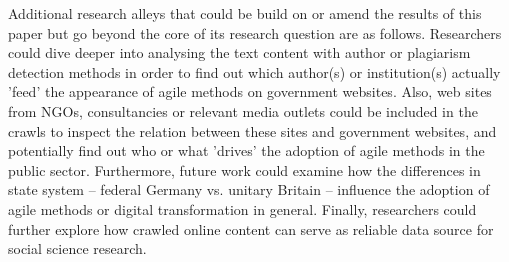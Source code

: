 Additional research alleys that could be build on or amend the results of this paper but go beyond the core of its research question are as follows. Researchers could dive deeper into analysing the text content with author or plagiarism detection methods in order to find out which author(s) or institution(s) actually 'feed' the appearance of agile methods on government websites. Also, web sites from NGOs, consultancies or relevant media outlets could be included in the crawls to inspect the relation between these sites and government websites, and potentially find out who or what 'drives' the adoption of agile methods in the public sector. Furthermore, future work could examine how the differences in state system – federal Germany vs. unitary Britain – influence the adoption of agile methods or digital transformation in general. Finally, researchers could further explore how crawled online content can serve as reliable data source for social science research.